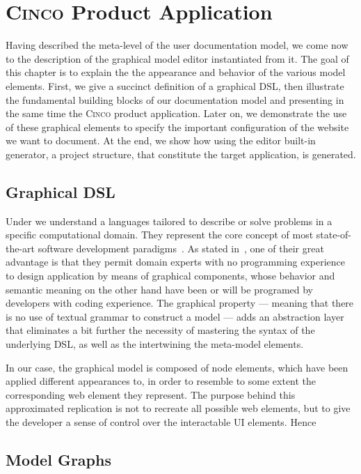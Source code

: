 \chapter{\textsc{Cinco} Product Application}\label{ch:CP}

Having described the meta-level of the user documentation model, we come now to the description of the graphical model editor instantiated from it. The goal of this chapter is to explain the the appearance and behavior of the various model elements. First, we give a succinct definition of a graphical DSL, then illustrate the fundamental building blocks of our documentation model and presenting in the same time the \textsc{Cinco} product application. Later on, we demonstrate the use of these graphical elements to specify the important configuration of the website we want to document. At the end, we show how using the editor built-in generator, a project structure, that constitute the target application, is generated.

\section{Graphical DSL}\label{sec:gDSL}

Under  we understand a languages tailored to describe or solve problems in a specific computational domain. They represent the core concept of most state-of-the-art software development paradigms~\cite{perez-et_al}. As stated in~\cite{Naujokat2018}, one of their great advantage is that they permit domain experts with no programming experience to design application by means of graphical components, whose behavior and semantic meaning on the other hand have been or will be programed by developers with coding experience. The graphical property --- meaning that there is no use of textual grammar to construct a model --- adds an abstraction layer that eliminates a bit further the necessity of mastering the syntax of the underlying DSL, as well as the  intertwining the meta-model elements.

In our case, the graphical model is composed of node elements, which have been applied different appearances to, in order to resemble to some extent the corresponding web element they represent. The purpose behind this approximated replication is not to recreate all possible web elements, but to give the developer a sense of control over the interactable UI elements. Hence

\section{Model Graphs}\label{sec:ModElem}


